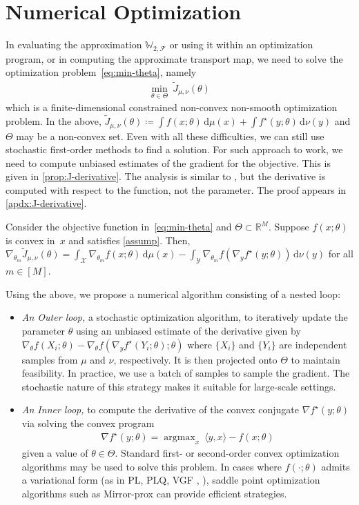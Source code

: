 \documentclass[10pt]{article}
\newcommand{\ud}{\,\mathrm{d}}
\renewcommand{\tilde}{\widetilde}
\newcommand{\argmax}{\mathop{\operatorname{argmax}}}
\newcommand{\W}{\mathds{W}}
\newcommand{\calF}{\mathcal{F}}
\newcommand{\calX}{\mathcal{X}}
\newcommand{\calY}{\mathcal{Y}}
\numberwithin{equation}{section}
\begin{document}
\section{Numerical Optimization}\label{sec:numerics}
In evaluating the approximation $\W_{2,\calF}$ or using it within an optimization program, or in computing the approximate transport map, we need to solve the optimization problem~\eqref{eq:min-theta}, namely 
\begin{align*}%
\min_{\theta\in\Theta} ~ \tilde J_{\mu,\nu}(\theta)
\end{align*}
which is a finite-dimensional constrained non-convex non-smooth optimization problem. In the above, $\tilde J_{\mu,\nu}(\theta)\coloneqq \int f(x;\theta)\ud \mu(x) + \int f^\star(y;\theta)\ud \nu(y)$ and $\Theta$ may be a non-convex set. Even with all these difficulties, we can still use stochastic first-order methods to find a solution. For such approach to work, we need to compute unbiased estimates of the gradient for the objective. This is given in \autoref{prop:J-derivative}. The analysis is similar to \citet{chartrand2009gradient}, but the derivative is computed with respect to the function, not the parameter. The proof appears in \autoref{apdx:J-derivative}. 
\begin{theorem}\label{prop:J-derivative}
	Consider the objective function in~\eqref{eq:min-theta} and $\Theta\subset \mathbb{R}^M$. Suppose $f(x;\theta)$ is convex in~$x$ and satisfies \autoref{assump}. Then, $\nabla_{\theta_m} \tilde{J}_{\mu,\nu}(\theta) = \int_\calX \nabla_{\theta_m} f(x;\theta) \ud \mu(x) - \int_\calY \nabla_{\theta_m} f(\nabla_y f^\star(y;\theta)) \ud \nu(y)$ for all $m\in[M]$.
\end{theorem}

Using the above, we propose a numerical algorithm consisting of a nested loop:
\begin{itemize} 
\item 
	{\em An Outer loop,} a stochastic optimization algorithm, to iteratively update the parameter $\theta$ using an unbiased estimate of the derivative given by $ \nabla_\theta f(X_i;\theta) - \nabla_\theta f(\nabla_y f^\star(Y_i;\theta);\theta)$ where $\{X_i\}$ and $\{Y_i\}$ are independent samples from $\mu$ and $\nu$, respectively. It is then projected onto $\Theta$ to maintain feasibility. In practice, we use a batch of samples to sample the gradient. The stochastic nature of this strategy makes it suitable for large-scale settings. 
\item 
	{\em An Inner loop,} to compute the derivative of the convex conjugate $\nabla f^\star(y;\theta) $ via solving the convex program 
	\begin{align} \label{eq:nablafs}
	\nabla f^\star(y;\theta) = \argmax_x ~ \langle y ,x\rangle - f(x;\theta) \end{align} 
	given a value of $\theta\in \Theta$. Standard first- or second-order convex optimization algorithms may be used to solve this problem. In cases where $f(\cdot;\theta)$ admits a variational form (as in PL, PLQ, VGF \cite{jalali2017variational}, \cite{aravkin2013sparse}), saddle point optimization algorithms such as Mirror-prox can provide efficient strategies. 
\end{itemize}
\end{document}
